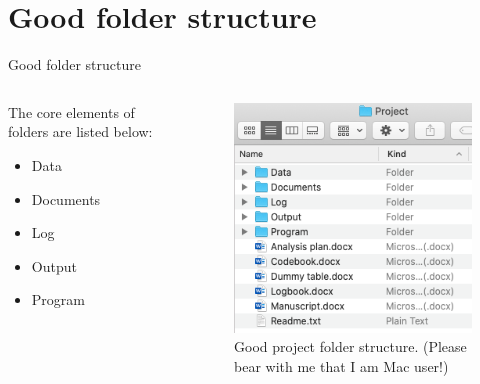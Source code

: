 \section{Good folder structure}
\begin{frame}{Good folder structure}
	\begin{columns}
	\begin{column}{0.5\textwidth}
	The core elements of folders are listed below:
		\begin{itemize}
				\item Data
				\item Documents
				\item Log
				\item Output
				\item Program
		\end{itemize}
	\end{column}
	
	\begin{column}{0.5\textwidth}
	\begin{figure}
			\includegraphics[scale=0.4]{image/structure}
			\caption{Good project folder structure. (Please bear with me that I am Mac user!)}
	\end{figure}
	\end{column}
	\end{columns}

\end{frame}

